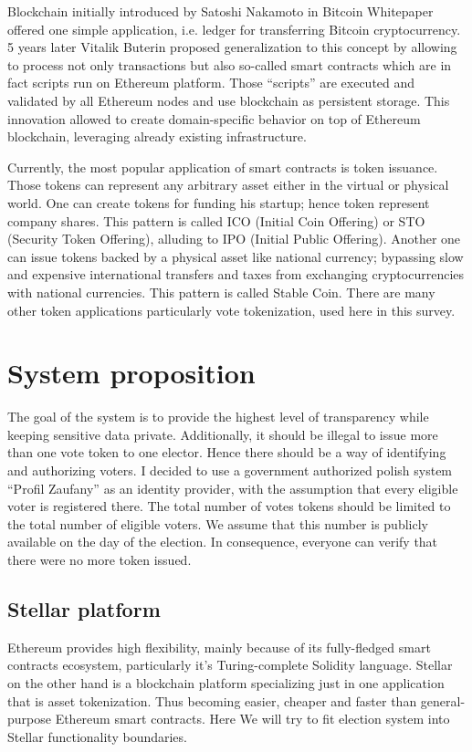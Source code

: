 \documentclass[runningheads]{llncs}
\begin{document}
Blockchain initially introduced by Satoshi Nakamoto in Bitcoin Whitepaper offered one simple application, i.e. ledger for transferring Bitcoin cryptocurrency. 5 years later Vitalik Buterin proposed generalization to this concept by allowing to process not only transactions but also so-called smart contracts which are in fact scripts run on Ethereum platform. Those “scripts” are executed and validated by all Ethereum nodes and use blockchain as persistent storage. This innovation allowed to create domain-specific behavior on top of Ethereum blockchain, leveraging already existing infrastructure.

Currently, the most popular application of smart contracts is token issuance. Those tokens can represent any arbitrary asset either in the virtual or physical world. One can create tokens for funding his startup; hence token represent company shares. This pattern is called ICO (Initial Coin Offering) or STO (Security Token Offering), alluding to IPO (Initial Public Offering). Another one can issue tokens backed by a physical asset like national currency; bypassing slow and expensive international transfers and taxes from exchanging cryptocurrencies with national currencies. This pattern is called Stable Coin. There are many other token applications particularly vote tokenization, used here in this survey.


\section{System proposition}
The goal of the system is to provide the highest level of transparency while keeping sensitive data private. Additionally, it should be illegal to issue more than one vote token to one elector. Hence there should be a way of identifying and authorizing voters. I decided to use a government authorized polish system
“Profil Zaufany” as an identity provider, with the assumption that every eligible voter is registered there. The total number of votes tokens should be limited to the total number of eligible voters. We assume that this number is publicly available on the day of the election. In consequence, everyone can verify that there were no more token issued. 

\subsection{Stellar platform}
Ethereum provides high flexibility, mainly because of its fully-fledged smart contracts ecosystem, particularly it’s Turing-complete Solidity language. Stellar on the other hand is a blockchain platform specializing just in one application that is asset tokenization. Thus becoming easier, cheaper and faster than general-purpose Ethereum smart contracts. Here We will try to fit election system into Stellar functionality boundaries.
\end{document}
